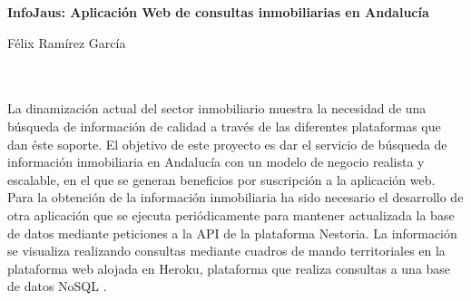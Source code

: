 \begin{center}
{\large\bfseries InfoJaus: Aplicación Web de consultas inmobiliarias en Andalucía}\\
\end{center}

\begin{center}
Félix Ramírez García\\
\end{center}

\begin{flushleft}
	\\
	
	\vspace{0.7cm}
	\\
	La dinamización actual del sector inmobiliario muestra la necesidad de una búsqueda de información de calidad a través de las diferentes plataformas que dan éste soporte.  
	El objetivo de este proyecto es dar el servicio de búsqueda de información inmobiliaria en Andalucía con un modelo de negocio realista y escalable, en el que se generan beneficios por suscripción a la aplicación web.
	Para la obtención de la información inmobiliaria ha sido necesario el desarrollo de otra aplicación que se ejecuta periódicamente para mantener actualizada la base de datos mediante peticiones a la API de la plataforma Nestoria.
	La información se visualiza realizando consultas mediante cuadros de mando territoriales en la plataforma web alojada en Heroku, plataforma que realiza consultas a una base de datos NoSQL .
\end{flushleft}

\newpage %


